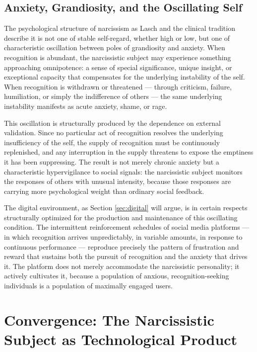 \documentclass[12pt]{memoir}
\begin{document}
\subsection{Anxiety, Grandiosity, and the Oscillating Self}

The psychological structure of narcissism as Lasch and the clinical tradition describe
it is not one of stable self-regard, whether high or low, but one of characteristic
oscillation between poles of grandiosity and anxiety. When recognition is abundant,
the narcissistic subject may experience something approaching omnipotence: a sense of
special significance, unique insight, or exceptional capacity that compensates for the
underlying instability of the self. When recognition is withdrawn or threatened —
through criticism, failure, humiliation, or simply the indifference of others — the
same underlying instability manifests as acute anxiety, shame, or rage.

This oscillation is structurally produced by the dependence on external validation.
Since no particular act of recognition resolves the underlying insufficiency of the
self, the supply of recognition must be continuously replenished, and any interruption
in the supply threatens to expose the emptiness it has been suppressing. The result
is not merely chronic anxiety but a characteristic hypervigilance to social signals:
the narcissistic subject monitors the responses of others with unusual intensity,
because those responses are carrying more psychological weight than ordinary social
feedback.

The digital environment, as Section \ref{sec:digital} will argue, is in certain
respects structurally optimized for the production and maintenance of this
oscillating condition. The intermittent reinforcement schedules of social media
platforms — in which recognition arrives unpredictably, in variable amounts, in
response to continuous performance — reproduce precisely the pattern of frustration
and reward that sustains both the pursuit of recognition and the anxiety that drives
it. The platform does not merely accommodate the narcissistic personality; it actively
cultivates it, because a population of anxious, recognition-seeking individuals is a
population of maximally engaged users.

\section{Convergence: The Narcissistic Subject as Technological Product}
\label{sec:convergence}
\end{document}

